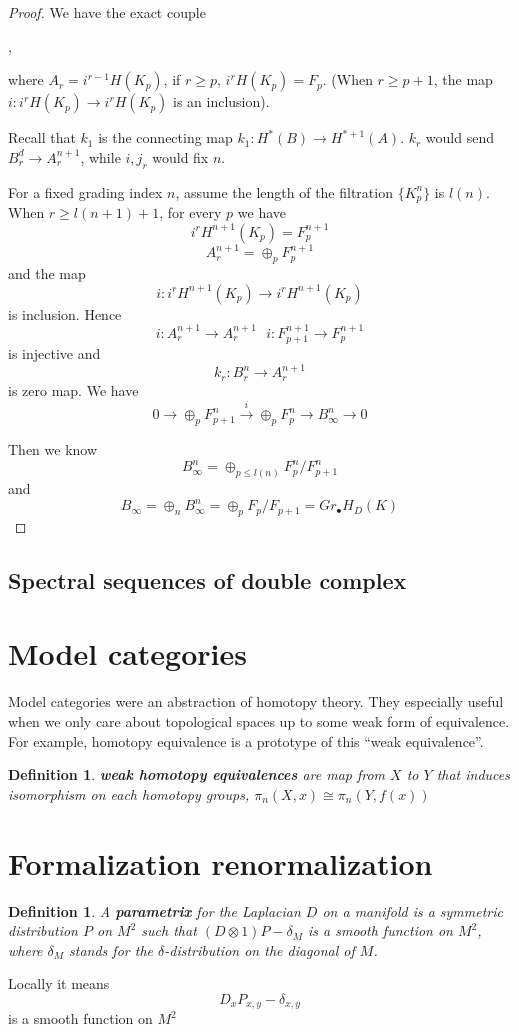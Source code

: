 \documentclass[11pt]{article}
\newtheorem{dfn}[thm]{Definition}
\newcommand{\lrta}{\longrightarrow}
\begin{document}
\begin{proof}
We have the exact couple
\begin{center}
,
\end{center}
where $A_r=i^{r-1}H(K_p)$, if $r\geq p$, $i^rH(K_p)=F_p$. (When $r\geq p+1$, the map $i:i^rH(K_p)\lrta i^rH(K_p)$ is an inclusion).

Recall that $k_1$ is the connecting map $k_1:H^{*}(B)\lrta H^{*+1}(A)$. $k_r$ would send $B_r^d\lrta A_r^{n+1}$, while $i,j_r$ would fix $n$.

For a fixed grading index $n$, assume the length of the filtration $\{K_p^n\}$ is $l(n)$. When $r\geq l(n+1)+1$, for every $p$ we have
$$
i^rH^{n+1}(K_p)=F_p^{n+1}
$$
$$
A_r^{n+1}=\oplus_p F_p^{n+1}
$$
and the map
$$
i: i^rH^{n+1}(K_p)\lrta i^rH^{n+1}(K_p)
$$
is inclusion. Hence 
$$
i:A_r^{n+1}\lrta A_r^{n+1}\ \ \ i:F_{p+1}^{n+1}\lrta F_{p}^{n+1}
$$
is injective and 
$$
k_r:B_r^{n}\lrta A_r^{n+1}
$$
is zero map. We have
$$
0\lrta \oplus_p F_{p+1}^{n}\overset{i}{\lrta} \oplus_p F_{p}^{n}\lrta B_\infty^n\lrta 0 
$$

Then we know
$$
B_\infty^n=\oplus_{p\leq l(n)}F^{n}_p/F^n_{p+1}
$$
and 
$$
B_\infty=\oplus_n B_\infty^n=\oplus_p F_p/F_{p+1}=Gr_\bullet H_D(K)
$$

\end{proof}
\subsection{Spectral sequences of double complex}

\section{Model categories}
Model categories were an abstraction of homotopy theory. They especially useful when we only care about topological spaces up to some weak form of equivalence. For example, homotopy equivalence is a prototype of this ``weak equivalence''.
\begin{dfn}
\textbf{weak homotopy equivalences} are map from $X$ to $Y$ that induces isomorphism on each homotopy groups, $\pi_n(X,x)\cong \pi_n(Y,f(x))$
\end{dfn}

\section{Formalization renormalization}
\begin{dfn}
A \textbf{parametrix} for the Laplacian $D$ on a manifold is a symmetric distribution $P$ on $M^2$ such that $(D\otimes 1)P-\delta_M$ is a smooth function on $M^2$, where $\delta_M$ stands for the $\delta$-distribution on the diagonal of $M$.
\end{dfn}
Locally it means
$$
D_x P_{x,y}-\delta_{x,y}
$$
is a smooth function on $M^2$
\end{document}
